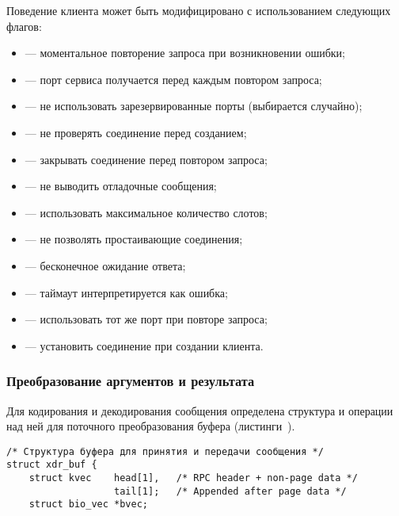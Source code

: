Поведение клиента может быть модифицировано с использованием следующих флагов:
\begin{itemize}
    \item {} --- моментальное повторение запроса
          при возникновении ошибки;
    \item {} --- порт сервиса получается перед
          каждым повтором запроса;
    \item {} --- не использовать
          зарезервированные порты (выбирается случайно);
    \item {} --- не проверять соединение перед
          созданием;
    \item {} --- закрывать соединение перед
          повтором запроса;
    \item {} --- не выводить отладочные сообщения;
    \item {} --- использовать максимальное
          количество слотов;
    \item {} --- не позволять простаивающие
          соединения;
    \item {} --- бесконечное ожидание
          ответа;
    \item {} --- таймаут интерпретируется как
          ошибка;
    \item {} --- использовать тот же порт при
          повторе запроса;
    \item {} --- установить соединение при
          создании клиента.
\end{itemize}

\subsubsection{Преобразование аргументов и результата}

Для кодирования и декодирования сообщения определена структура и операции над
ней для поточного преобразования буфера
(листинги~).

\begin{lstlisting}[caption={Структура буфера (часть 1)}, label={lst:xdr1}]
/* Структура буфера для принятия и передачи сообщения */
struct xdr_buf {
    struct kvec    head[1],   /* RPC header + non-page data */
                   tail[1];   /* Appended after page data */
    struct bio_vec *bvec;
\end{lstlisting}

